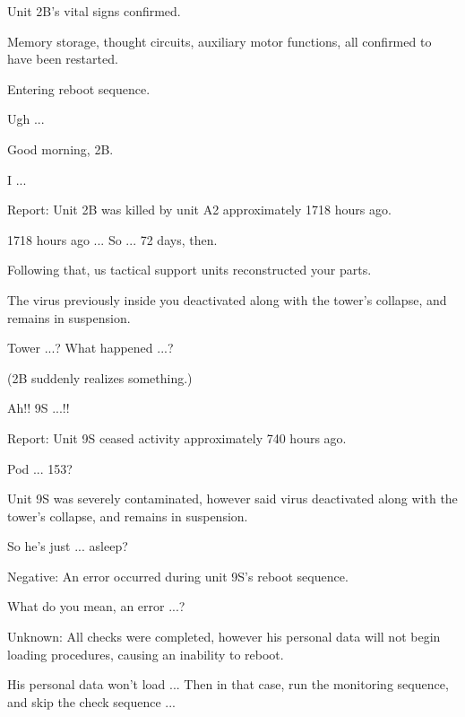 \begin{play}


  Unit 2B's vital signs confirmed.

  Memory storage, thought circuits, auxiliary motor functions, all confirmed to have been restarted.

  Entering reboot sequence.

  Ugh ...

  Good morning, 2B.

  I ...

  Report: Unit 2B was killed by unit A2 approximately 1718 hours ago.

  1718 hours ago ... So ... 72 days, then.

  Following that, us tactical support units reconstructed your parts.

  The virus previously inside you deactivated along with the tower's collapse, and remains in suspension. 

  Tower ...? What happened ...?

(2B suddenly realizes something.)

  Ah!! 9S ...!!

  Report: Unit 9S ceased activity approximately 740 hours ago.

  Pod ... 153?

  Unit 9S was severely contaminated, however said virus deactivated along with the tower's collapse, and remains in suspension.

  So he's just ... asleep?

  Negative: An error occurred during unit 9S's reboot sequence.

  What do you mean, an error ...?

  Unknown: All checks were completed, however his personal data will not begin loading procedures, causing an inability to reboot.

  His personal data won't load ... Then in that case, run the monitoring sequence, and skip the check sequence ...


\end{play}
